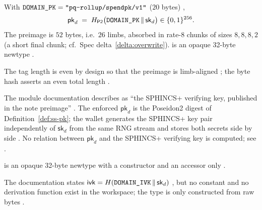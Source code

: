 \begin{definition}
\label{def:ss-pk}
With $\texttt{DOMAIN\_PK} = \texttt{"pq-rollup/spendpk/v1"}$ ($20$ bytes)
,
\begin{equation}
  \mathsf{pk}_d \;=\; H_{\mathsf{P2}}\big(\texttt{DOMAIN\_PK}\,\|\,\mathsf{sk}_d\big) \in \{0,1\}^{256}.
\end{equation}
The preimage is $52$ bytes, i.e.\ $26$ limbs, absorbed in rate-$8$ chunks of
sizes $8,8,8,2$ (a short final chunk; cf.\ Spec delta~\ref{delta:overwrite}).
 is an opaque 32-byte newtype
.
\end{definition}

The tag length is even by design so that the preimage is limb-aligned
; the byte hash asserts an even total
length .

\begin{specdelta}
The module documentation describes  as ``the SPHINCS+
verifying key, published in the note preimage''
. The enforced $\mathsf{pk}_d$ is the
Poseidon2 digest of Definition~\ref{def:ss-pk}; the wallet generates the
SPHINCS+ key pair independently of $\mathsf{sk}_d$ from the same RNG stream
 and stores both secrets side by side
. No relation between $\mathsf{pk}_d$
and the SPHINCS+ verifying key is computed; see .
\end{specdelta}

\begin{definition}
 is an opaque 32-byte newtype with a constructor and
an accessor only .
\end{definition}

\begin{specdelta}
The documentation states $\mathsf{ivk} = H(\texttt{DOMAIN\_IVK}\,\|\,\mathsf{sk}_d)$
, but no  constant and
no derivation function exist in the workspace; the type is only constructed
from raw bytes .
\end{specdelta}

